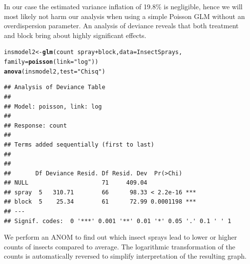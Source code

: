 \documentclass[a4paper]{article}\usepackage[]{graphicx}\usepackage[]{color}
\makeatletter
\newcommand{\hlstr}[1]{\textcolor[rgb]{0.192,0.494,0.8}{#1}}%
\newcommand{\hlopt}[1]{\textcolor[rgb]{0,0,0}{#1}}%
\newcommand{\hlstd}[1]{\textcolor[rgb]{0.345,0.345,0.345}{#1}}%
\newcommand{\hlkwb}[1]{\textcolor[rgb]{0.69,0.353,0.396}{#1}}%
\newcommand{\hlkwc}[1]{\textcolor[rgb]{0.333,0.667,0.333}{#1}}%
\newcommand{\hlkwd}[1]{\textcolor[rgb]{0.737,0.353,0.396}{\textbf{#1}}}%
\newenvironment{kframe}{%
 \def\at@end@of@kframe{}%
 \ifinner\ifhmode%
  \def\at@end@of@kframe{\end{minipage}}%
  \begin{minipage}{\columnwidth}%
 \fi\fi%
 \def\FrameCommand##1{\hskip\@totalleftmargin \hskip-\fboxsep
 \colorbox{shadecolor}{##1}\hskip-\fboxsep
     \hskip-\linewidth \hskip-\@totalleftmargin \hskip\columnwidth}%
 \MakeFramed {\advance\hsize-\width
   \@totalleftmargin\z@ \linewidth\hsize
   \@setminipage}}%
 {\par\unskip\endMakeFramed%
 \at@end@of@kframe}
\newenvironment{knitrout}{}{} %
\makeatother
\begin{document}
In our case the estimated variance inflation of 19.8\% is negligible, hence we will most likely not harm our analysis when using a simple Poisson GLM without an overdispersion parameter. An analysis of deviance reveals that both treatment and block bring about highly significant effects.

\begin{knitrout}
\color{fgcolor}\begin{kframe}
\begin{alltt}
\hlstd{insmodel2} \hlkwb{<-} \hlkwd{glm}\hlstd{(count} \hlopt{~} \hlstd{spray} \hlopt{+} \hlstd{block,} \hlkwc{data}\hlstd{=InsectSprays,}
                 \hlkwc{family}\hlstd{=}\hlkwd{poisson}\hlstd{(}\hlkwc{link}\hlstd{=}\hlstr{"log"}\hlstd{))}
\hlkwd{anova}\hlstd{(insmodel2,} \hlkwc{test}\hlstd{=}\hlstr{"Chisq"}\hlstd{)}
\end{alltt}
\begin{verbatim}
## Analysis of Deviance Table
## 
## Model: poisson, link: log
## 
## Response: count
## 
## Terms added sequentially (first to last)
## 
## 
##       Df Deviance Resid. Df Resid. Dev  Pr(>Chi)    
## NULL                     71     409.04              
## spray  5   310.71        66      98.33 < 2.2e-16 ***
## block  5    25.34        61      72.99 0.0001198 ***
## ---
## Signif. codes:  0 '***' 0.001 '**' 0.01 '*' 0.05 '.' 0.1 ' ' 1
\end{verbatim}
\end{kframe}
\end{knitrout}

We perform an ANOM to find out which insect sprays lead to lower or higher counts of insects compared to average. The logarithmic transformation of the counts is automatically reversed to simplify interpretation of the resulting graph. 
\end{document}
